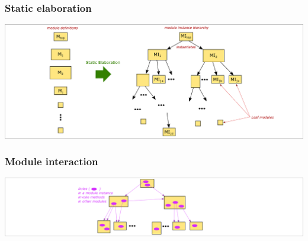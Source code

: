 
\begin{frame}
\frametitle{Static elaboration}

\begin{center}
\includegraphics[width=\textwidth]{../Figures/Fig_BSV_static_elaboration}
\end{center}

\end{frame}


\begin{frame}
\frametitle{Module interaction}

\begin{center}
\includegraphics[width=\textwidth]{../Figures/Fig_BSV_module_interaction}
\end{center}

\end{frame}






